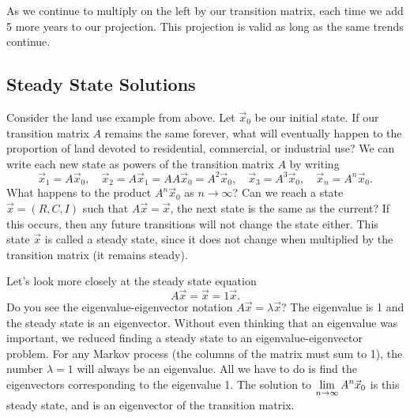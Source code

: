 \begin{example}
\begin{center}
\end{center}
As we continue to multiply on the left by our transition matrix, each time we add 5 more years to our projection. This projection is valid as long as the same trends continue. 
\end{example}










\subsection{Steady State Solutions}


Consider the land use example from above.  Let $\vec x_0$ be our initial state. If our transition matrix $A$ remains the same forever, what will eventually happen to the proportion of land devoted to residential, commercial, or industrial use? We can write each new state as powers of the transition matrix $A$ by writing 
$$\vec x_{1} = A \vec x_{0}, \quad \vec x_{2}=A \vec x_{1} = AA\vec x_{0} = A^2\vec x_{0},\quad \vec x_{3}= A^3\vec x_{0},\quad \vec x_{n}= A^n\vec x_{0}.$$  What happens to the product $A^n\vec x_0$ as $n\to \infty$? Can we reach a state $\vec x = (R,C,I)$ such that $A \vec x=\vec x$, the next state is the same as the current? If this occurs, then any future transitions will not change the state either. This state $\vec x$ is called a steady state, since it does not change when multiplied by the transition matrix (it remains steady). 

Let's look more closely at the steady state equation $$A\vec x = \vec x = 1\vec x.$$ 
Do you see the eigenvalue-eigenvector notation $A\vec x = \lambda \vec x$? 
The eigenvalue is 1 and the steady state is an eigenvector. 
Without even thinking that an eigenvalue was important, we reduced finding a steady state to an eigenvalue-eigenvector problem. 
For any Markov process (the columns of the matrix must sum to 1), the number $\lambda = 1$ will always be an eigenvalue. All we have to do is find the eigenvectors corresponding to the eigenvalue 1. 
The solution to $\displaystyle\lim_{n\to\infty}A^n \vec x_0$ is this steady state, and is an eigenvector of the transition matrix.
 
